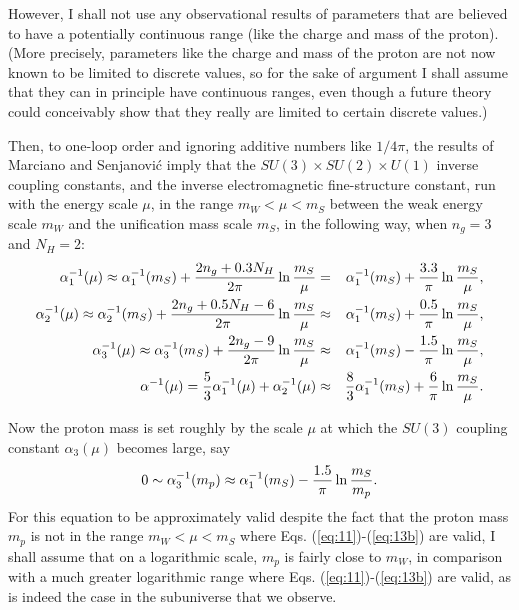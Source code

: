 \documentclass[a4paper,12pt]{article}
\begin{document}
	However, I shall not use any observational
results of parameters that are believed to have a potentially
continuous range (like the charge and mass of the proton).
(More precisely, parameters like the charge and mass of the proton
are not now known to be limited to discrete values,
so for the sake of argument I shall assume that they can in principle
have continuous ranges,
even though a future theory could conceivably show that they
really are limited to certain discrete values.)

	Then, to one-loop order and ignoring additive numbers like
$1/4\pi$, the results of Marciano and Senjanovi\'c \cite{MarCen}
imply that the $SU(3)\times SU(2)\times U(1)$ inverse
coupling constants, and the inverse electromagnetic fine-structure
constant, run with the energy scale $\mu$,
in the range $m_W < \mu < m_S$ between the weak energy scale $m_W$
and the unification mass scale $m_S$, in the following way,
when $n_g = 3$ and $N_H = 2$:
 \begin{eqnarray}
 \alpha_1^{-1}(\mu) \approx \alpha_1^{-1}(m_S)
    +{2n_g+0.3N_H \over 2\pi}\ln{m_S\over\mu}
    &=& \alpha_1^{-1}(m_S) + {3.3\over\pi}\ln{m_S\over\mu},
 \label{eq:11} \\
 \alpha_2^{-1}(\mu) \approx \alpha_2^{-1}(m_S)
    +{2n_g+0.5N_H-6 \over 2\pi}\ln{m_S\over\mu}
    &\approx & \alpha_1^{-1}(m_S) + {0.5\over\pi}\ln{m_S\over\mu},
 \label{eq:12} \\
 \alpha_3^{-1}(\mu) \approx \alpha_3^{-1}(m_S)
    +{2n_g-9 \over 2\pi}\ln{m_S\over\mu}
    &\approx & \alpha_1^{-1}(m_S) - {1.5\over\pi}\ln{m_S\over\mu},
 \label{eq:13} \\
 \alpha^{-1}(\mu) = {5\over 3}\alpha_1^{-1}(\mu)
    + \alpha_2^{-1}(\mu)
   &\approx &{8\over 3}\alpha_1^{-1}(m_S)+{6\over\pi}\ln{m_S\over\mu}.
 \label{eq:13b}
 \end{eqnarray}
 
	Now the proton mass is set roughly by the scale $\mu$ at which
the $SU(3)$ coupling constant $\alpha_3(\mu)$ becomes large, say
 \begin{equation}
 0 \sim \alpha_3^{-1}(m_p)
   \approx \alpha_1^{-1}(m_S) - {1.5\over\pi}\ln{m_S\over m_p}.
 \label{eq:14}
 \end{equation}
For this equation to be approximately valid despite the fact
that the proton mass $m_p$ is not in the range
$m_W < \mu < m_S$ where Eqs. (\ref{eq:11})-(\ref{eq:13b}) are valid,
I shall assume that on a logarithmic scale,
$m_p$ is fairly close to $m_W$, in comparison with
a much greater logarithmic range where
Eqs. (\ref{eq:11})-(\ref{eq:13b}) are valid,
as is indeed the case in the subuniverse that we observe.
\end{document}
